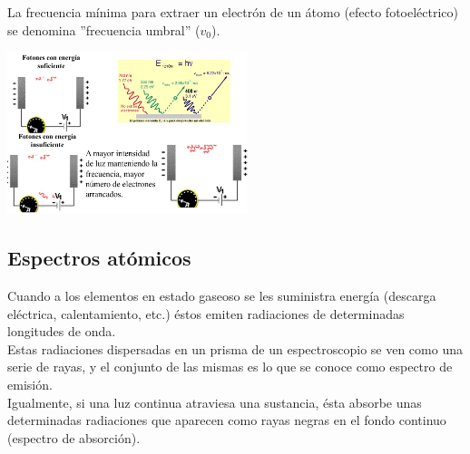         \indent La frecuencia mínima para extraer un electrón de un átomo (efecto fotoeléctrico) se denomina ''frecuencia umbral'' ($v_0$).
        \begin{center} \includegraphics[width=7cm]{./imagenes/frecuenciaUmbral.png} \end{center}

    \subsection{Espectros atómicos}
        \indent Cuando a los elementos en estado gaseoso se les suministra energía (descarga eléctrica, calentamiento, etc.) éstos emiten radiaciones de determinadas longitudes de onda. \\
        \indent Estas radiaciones dispersadas en un prisma de un espectroscopio se ven como una serie de rayas, y el conjunto de las mismas es lo que se conoce como espectro de emisión. \\
        \indent Igualmente, si una luz continua atraviesa una sustancia, ésta absorbe unas determinadas radiaciones que aparecen como rayas negras en el fondo continuo (espectro de absorción). \\

